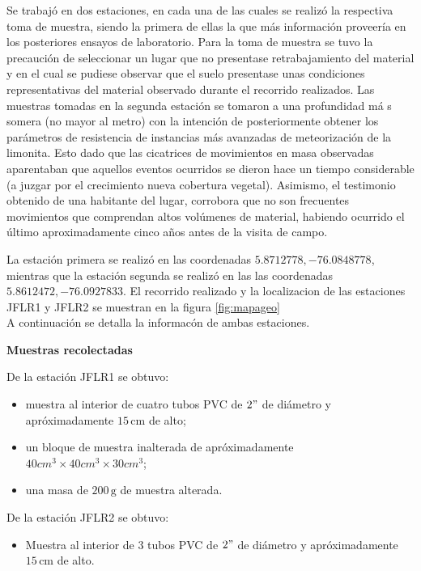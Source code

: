 Se trabaj\'o en dos estaciones, en cada una de las cuales se realiz\'o la respectiva toma de muestra, siendo la primera de ellas la que m\'as informaci\'on proveer\'ia en los posteriores ensayos de laboratorio. Para la toma de muestra se tuvo la precauci\'on de seleccionar un lugar que no presentase retrabajamiento del material y en el cual se pudiese observar que el suelo presentase unas condiciones representativas del material observado durante el recorrido realizados.
Las muestras tomadas en la segunda estaci\'on se tomaron a una profundidad m\'a s somera (no mayor al metro) con la intenci\'on de posteriormente obtener los par\'ametros de resistencia de instancias m\'as avanzadas de meteorizaci\'on de la limonita. Esto dado que las cicatrices de movimientos en masa observadas aparentaban que aquellos eventos ocurridos se dieron hace un tiempo considerable (a juzgar por el crecimiento nueva cobertura vegetal). Asimismo, el testimonio obtenido de una habitante del lugar, corrobora que no son frecuentes movimientos que comprendan altos vol\'umenes de material, habiendo ocurrido el \'ultimo aproximadamente cinco a\~nos antes de la visita de campo.

La estaci\'on primera se realiz\'o en las coordenadas \(5.8712778, -76.0848778\), mientras que la estaci\'on segunda se realiz\'o en las las coordenadas \(5.8612472,-76.0927833\). El recorrido realizado y la localizacion de las estaciones JFLR1 y JFLR2 se muestran en la figura \ref{fig:mapageo}\\
A continuaci\'on se detalla la informac\'on de ambas estaciones.

\textbf{Muestras recolectadas}

De la estaci\'on JFLR1 se obtuvo:
\begin{itemize}
  \item muestra al interior de cuatro tubos PVC de \(2"\) de di\'ametro y apr\'oximadamente \(15\,\text{cm}\) de alto;
  \item un bloque de muestra inalterada  de apr\'oximadamente \(40cm^3 \times 40cm^3 \times 30cm^3\);
  \item una masa de \(200\,\text{g}\) de muestra alterada.
\end{itemize}

De la estaci\'on JFLR2 se obtuvo:
\begin{itemize}
  \item Muestra al interior de 3 tubos PVC de \(2"\) de di\'ametro y apr\'oximadamente \(15\,\text{cm}\) de alto.
\end{itemize}

